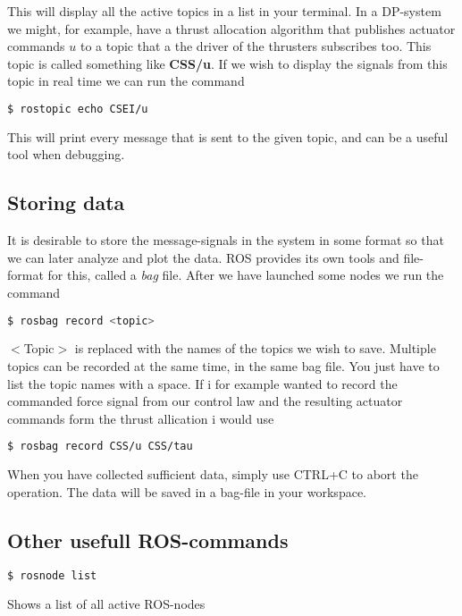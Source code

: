 This will display all the active topics in a list in your terminal. In a DP-system we might, for example, have a thrust allocation algorithm that publishes actuator commands $u$ to a topic that a the driver of the thrusters subscribes too. This topic is called something like \textbf{CSS/u}. If we wish to display the signals from this topic in real time we can run the command

\begin{lstlisting}[language=bash]
$ rostopic echo CSEI/u
\end{lstlisting}
This will print every message that is sent to the given topic, and can be a useful tool when debugging.

\subsection{Storing data}

It is desirable to store the message-signals in the system in some format so that we can later analyze and plot the data. ROS provides its own tools and file-format for this, called a \textit{bag} file. After we have launched some nodes we run the command 
\begin{lstlisting}[language=bash]
$ rosbag record <topic>
\end{lstlisting}

$<$Topic$>$ is replaced with the names of the topics we wish to save. Multiple topics can be recorded at the same time, in the same bag file. You just have to list the topic names with a space. If i for example wanted to record the commanded force signal from our control law and the resulting actuator commands form the thrust allication i would use 

\begin{lstlisting}[language=bash]
$ rosbag record CSS/u CSS/tau
\end{lstlisting}

When you have collected sufficient data, simply use CTRL+C to abort the operation. The data will be saved in a bag-file in your workspace.

\subsection{Other usefull ROS-commands}
\begin{lstlisting}[language=bash]
$ rosnode list
\end{lstlisting}
Shows a list of all active ROS-nodes
